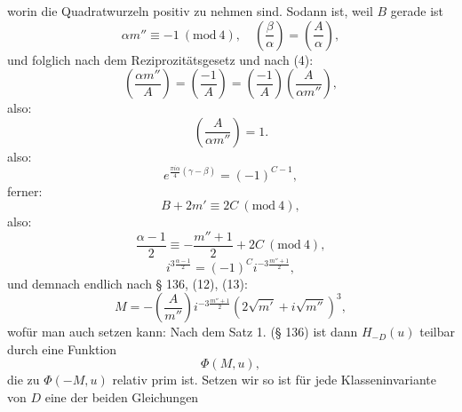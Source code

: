 worin die Quadratwurzeln positiv zu nehmen sind. Sodann ist, weil $B$ gerade ist
\[
\alpha m'' \equiv -1 \ (\mathrm{mod}\ 4), \quad \left(\frac{\beta}{\alpha}\right)=\left(\frac{A}{\alpha}\right),
\]
und folglich nach dem Reziprozitätsgesetz und nach (4):
\[
\left(\frac{\alpha m''}{A}\right) = \left(\frac{-1}{A}\right) = \left(\frac{-1}{A}\right)\left(\frac{A}{\alpha m''}\right),
\]
also:
\[
\left(\frac{A}{\alpha m''}\right) = 1.
\]
also:
\[
e^{\frac{\pi i \alpha}{4}(\gamma-\beta)} = (-1)^{C-1},
\]
ferner:
\[
B + 2m' \equiv 2C \ (\mathrm{mod}\ 4),
\]
also:
\[
\frac{\alpha-1}{2} \equiv -\frac{m''+1}{2} + 2C \ (\mathrm{mod}\ 4),
\]
\[
i^{3\frac{\alpha-1}{2}} = (-1)^C i^{-3\frac{m''+1}{2}},
\]
und demnach endlich nach § 136, (12), (13):
\[
M = -\left(\frac{A}{m''}\right) i^{-3\frac{m''+1}{2}} \left(2\sqrt{m'} + i\sqrt{m''}\right)^3, %
\]
wofür man auch setzen kann:
Nach dem Satz 1. (§ 136) ist dann $H_{-D}(u)$ teilbar durch eine Funktion
\[
\Phi(M,u),
\]
die zu $\Phi(-M,u)$ relativ prim ist. Setzen wir
so ist für jede Klasseninvariante von $D$ eine der beiden Gleichungen
